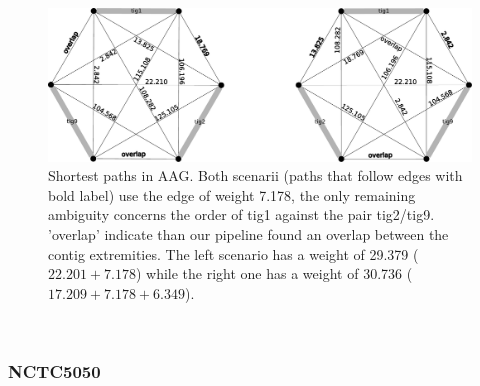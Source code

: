 \documentclass[../../main.tex]{subfiles}
\begin{document}
\begin{figure}[!hb]

    \centerline{\includegraphics[width=\textwidth]{supplemental/knot/NCTC12123_possible_solution-crop.pdf}}
%       
%
%
%
    \caption{
        Shortest paths in AAG. Both scenarii (paths that follow edges with bold label) use the edge of weight 7.178, the only remaining ambiguity concerns the order of tig1 against the pair tig2/tig9. 'overlap' indicate than our pipeline found an overlap between the contig extremities. The left scenario has a weight of 29.379 ($22.201 + 7.178$) while the right one has a weight of 30.736 ($17.209 + 7.178 + 6.349$).\ 
     }
     \label{fg:appendix:NCTC12123_solutions}
\end{figure}

~

\subsubsection*{NCTC5050}
\end{document}

